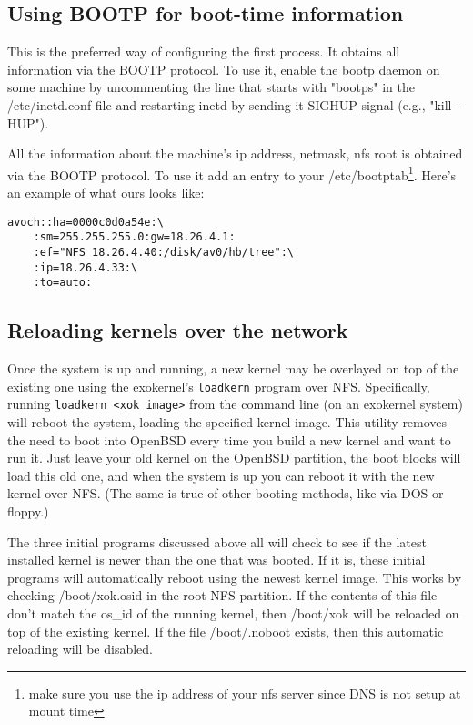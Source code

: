 \documentclass[11pt]{article}
\begin{document}
\subsection {Using BOOTP for boot-time information}

This is the preferred way of configuring the first process. It obtains
all information via the BOOTP protocol. To use it, enable the bootp
daemon on some machine by uncommenting the line that starts with
"bootps" in the /etc/inetd.conf file and restarting inetd by sending it
SIGHUP signal (e.g., "kill -HUP").

All the information about the machine's ip address, netmask, nfs root
is obtained via the BOOTP protocol.  To use it add an entry to your
/etc/bootptab\footnote{make sure you use the ip address of your nfs
server since DNS is not setup at mount time}. Here's an example of
what ours looks like:

\begin{verbatim}
avoch::ha=0000c0d0a54e:\
	:sm=255.255.255.0:gw=18.26.4.1:
	:ef="NFS 18.26.4.40:/disk/av0/hb/tree":\
	:ip=18.26.4.33:\
	:to=auto:
\end{verbatim}

\subsection{Reloading kernels over the network}

Once the system is up and running, a new kernel may be overlayed on top
of the existing one using the exokernel's {\tt loadkern} program over NFS.
Specifically, running {\tt loadkern <xok image>} from the command line
(on an exokernel system) will reboot the system, loading the specified
kernel image.  This utility removes the need to boot into
OpenBSD every time you build a new kernel and want to run it.  Just
leave your old kernel on the OpenBSD partition, the boot blocks will
load this old one, and when the system is up you can reboot it with
the new kernel over NFS.  (The same is true of other booting methods,
like via DOS or floppy.)

The three initial programs discussed above all will check to see
if the latest installed kernel is newer than the one that was booted.
If it is, these initial programs will automatically reboot using the newest
kernel image.  This works by checking /boot/xok.osid in the root NFS partition.
If the contents of this file don't match the os\_id of the running kernel,
then /boot/xok will be reloaded on top of the existing kernel.  If the file
/boot/.noboot exists, then this automatic reloading will be disabled.
\end{document}
